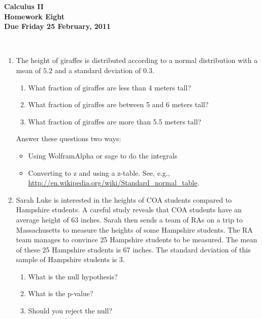 \documentclass[12pt]{article}
\begin{document}
\pagestyle{empty}

\begin{center}
{\large {\bf Calculus II}}\\
\medskip
{\large {\bf Homework Eight}}\\
\medskip
{ {\bf Due Friday 25 February, 2011}}\\
\end{center}

\hspace{2mm}\\



\begin{enumerate}
\setlength{\itemsep}{-1mm}
\item The height of giraffes is distributed according to a normal
  distribution with a mean of $5.2$ and a standard deviation of
  $0.3$.  
\begin{enumerate}
\setlength{\itemsep}{-1mm}
\item What fraction of giraffes are less than 4 meters tall?
\item What fraction of giraffes are between 5 and 6 meters tall?
\item What fraction of giraffes are more than 5.5 meters tall?
\end{enumerate}
Answer these questions two ways:
\begin{itemize}
\setlength{\itemsep}{-1mm}
\item Using WolframAlpha or sage to do the integrals
\item Converting to z and using a z-table. See, e.g.,
  \url{http://en.wikipedia.org/wiki/Standard_normal_table}.  
\end{itemize}

\item Sarah Luke is interested in the heights of COA students compared
  to Hampshire students.  A careful study reveals that COA students
  have an average height of 63 inches.  Sarah then sends a team of RAs
  on a trip to Massachusetts to measure the heights of some Hampshire
  students.  The RA team manages to convince 25 Hampshire students to
  be measured.  The mean of these 25 Hampshire students is 67 inches.
  The standard deviation of this sample of Hampshire students is 3.
\begin{enumerate}
\setlength{\itemsep}{-1mm}
  \item What is the null hypothesis?
  \item What is the p-value?
  \item Should you reject the null?  
\end{enumerate}

\end{enumerate}
\end{document}
